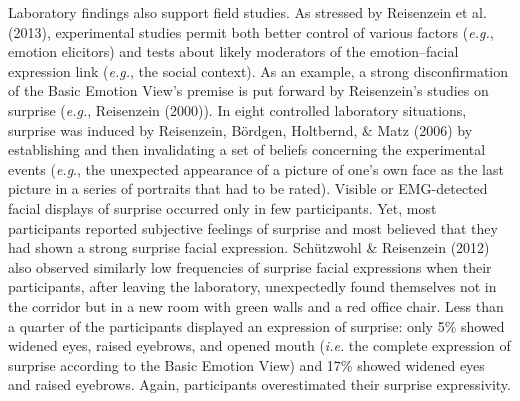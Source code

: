 \documentclass[man]{apa6}
\begin{document}
Laboratory findings also support field studies. As stressed by Reisenzein et al. (2013), experimental studies permit both better control of various factors (\emph{e.g.}, emotion elicitors) and tests about likely moderators of the emotion--facial expression link (\emph{e.g.}, the social context). As an example, a strong disconfirmation of the Basic Emotion View's premise is put forward by Reisenzein's studies on surprise (\emph{e.g.}, Reisenzein (2000)). In eight controlled laboratory situations, surprise was induced by Reisenzein, Bördgen, Holtbernd, \& Matz (2006) by establishing and then invalidating a set of beliefs concerning the experimental events (\emph{e.g}., the unexpected appearance of a picture of one's own face as the last picture in a series of portraits that had to be rated). Visible or EMG-detected facial displays of surprise occurred only in few participants. Yet, most participants reported subjective feelings of surprise and most believed that they had shown a strong surprise facial expression. Schützwohl \& Reisenzein (2012) also observed similarly low frequencies of surprise facial expressions when their participants, after leaving the laboratory, unexpectedly found themselves not in the corridor but in a new room with green walls and a red office chair. Less than a quarter of the participants displayed an expression of surprise: only 5\% showed widened eyes, raised eyebrows, and opened mouth (\emph{i.e.} the complete expression of surprise according to the Basic Emotion View) and 17\% showed widened eyes and raised eyebrows. Again, participants overestimated their surprise expressivity.
\end{document}
